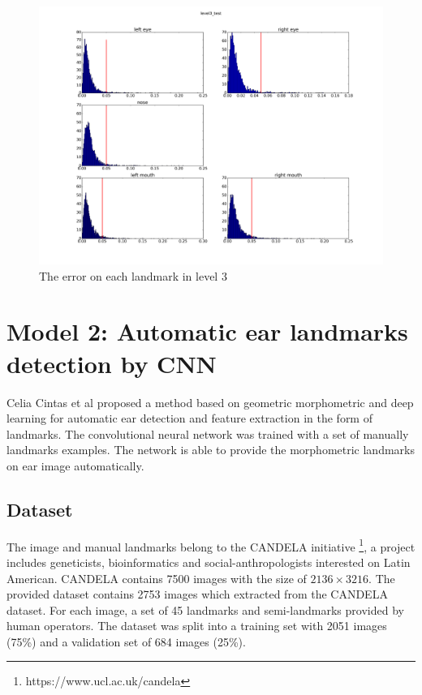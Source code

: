 	\begin{figure}[h!]
	\centering
	\includegraphics[scale=0.25]{images/level3_test}
	\caption{The error on each landmark in level 3}
	\label{rslevel3}
\end{figure}
\pagebreak
\section{Model 2: Automatic ear landmarks detection by CNN}
Celia Cintas et al\cite{cintas2016automatic} proposed a method based on geometric morphometric and deep learning for automatic ear detection and feature extraction in the form of landmarks. The convolutional neural network was trained with a set of manually landmarks examples. The network is able to provide the morphometric landmarks on ear image automatically.
\subsection{Dataset}
The image and manual landmarks belong to the CANDELA initiative \footnote{https://www.ucl.ac.uk/candela}, a project includes geneticists, bioinformatics and social-anthropologists interested on Latin American. CANDELA contains 7500 images with the size of $2136 \times 3216$. The provided dataset contains 2753 images which extracted from the CANDELA dataset. For each image, a set of 45 landmarks and semi-landmarks provided by human operators. The dataset was split into a training set with 2051 images (75\%) and a validation set of 684 images (25\%).
